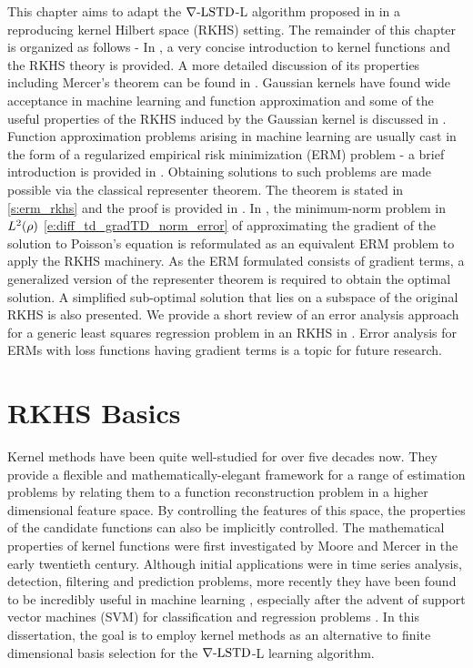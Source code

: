This chapter aims to adapt the $\nabla\text{-LSTD}$-L algorithm proposed in  in a reproducing kernel Hilbert space (RKHS) setting.  The remainder of this chapter is organized as follows - In , a very concise introduction to kernel functions and the RKHS theory is provided. A more detailed discussion of its properties including Mercer's theorem can be found in . Gaussian kernels have found wide acceptance in machine learning and function approximation and some of the useful properties of the RKHS induced by the Gaussian kernel is discussed in . Function approximation problems arising in machine learning are usually cast in the form of a regularized empirical risk minimization (ERM) problem - a brief introduction is provided in . Obtaining solutions to such problems are made possible via the classical representer theorem. The theorem is stated in \ref{s:erm_rkhs} and the proof is provided in . In , the minimum-norm problem in $L^2(\rho)$ \eqref{e:diff_td_gradTD_norm_error} of approximating the gradient of the solution to Poisson's equation is reformulated as an equivalent ERM problem to apply the RKHS machinery. As the ERM formulated consists of gradient terms, a generalized  version of the representer theorem is required to obtain the optimal solution.  A simplified sub-optimal solution that lies on a subspace of the original RKHS is also presented. We provide a short review of an error analysis approach for a generic least squares regression problem in an RKHS in . Error analysis for ERMs with loss functions having gradient terms is a topic for future research. 

\section{RKHS Basics}
\label{s:rkhs_basics}
Kernel methods have been quite well-studied for over five decades now. They provide a flexible and mathematically-elegant framework for a range of estimation problems by relating them to a function reconstruction problem in a higher dimensional feature space. By controlling the features of this space, the properties of the candidate functions can also be implicitly controlled. The mathematical properties of kernel functions were first investigated by Moore \cite{moo1916} and Mercer \cite{merrus09} in the early twentieth century. Although initial applications were in time series analysis, detection, filtering and prediction problems, more recently they have been found to be incredibly useful in machine learning \cite{wah90}, especially after the advent of support vector machines (SVM) for classification and regression problems \cite{corvap95, drucburkaufsmovap97}. In this dissertation, the goal is to employ kernel methods as an alternative to finite dimensional basis selection for the $\nabla\text{-LSTD}$-L learning algorithm. 

